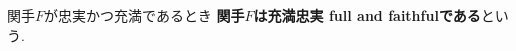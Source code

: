 \begin{Def}
関手$F$が忠実かつ充満であるとき
{\bf 関手$F$は充満忠実 full and faithfulである}という.
\end{Def}
\begin{comment}
\begin{Def}
圏$\mathscr{A}$が圏$\mathscr{A}$の部分圏であり, 関手$F:\mathscr{A}\rightarrow\mathscr{B}$が充満であるとき,
{\bf 圏$\mathscr{A}$は圏 $\mathscr{B}$の充満部分圏である}という.
\end{Def}
\end{comment}
\begin{comment}
\begin{example}
...充満忠実である.
\end{example}
\begin{example}
...忠実だが充満でない
\end{example}
\begin{example}
充満だが忠実でない
\end{example}
\begin{example}
複素数...

...

...忠実だが充満でない. （例1.30)
\end{example}
\end{comment}
\begin{comment}
\subsection{埋め込み関手}
\subsection{忘却関手}
\end{comment}
